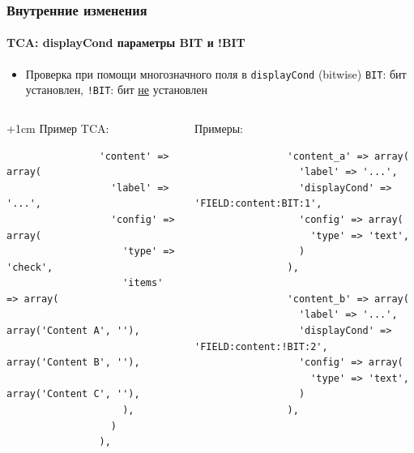 
\begin{frame}[fragile]
	\frametitle{Внутренние изменения}
	\framesubtitle{TCA: displayCond параметры BIT и !BIT}

	\lstset{
		basicstyle=\tiny\ttfamily
	}

	\begin{itemize}
		\item Проверка при помощи многозначного поля в \texttt{displayCond} (bitwise)\newline
			\texttt{BIT}: бит установлен, \texttt{!BIT}: бит \underline{не} установлен
	\end{itemize}

	\begin{columns}[T]

		\begin{column}{.5\textwidth}

			\advance\leftskip+1cm
			Пример TCA:

			\lstset{xleftmargin=1cm}

			\begin{lstlisting}
				'content' => array(
				  'label' => '...',
				  'config' => array(
				    'type' => 'check',
				    'items' => array(
				      array('Content A', ''),
				      array('Content B', ''),
				      array('Content C', ''),
				    ),
				  )
				),
			\end{lstlisting}

		\end{column}
		\begin{column}{.5\textwidth}

			Примеры:

			\begin{lstlisting}
				'content_a' => array(
				  'label' => '...',
				  'displayCond' => 'FIELD:content:BIT:1',
				  'config' => array(
				    'type' => 'text',
				  )
				),

				'content_b' => array(
				  'label' => '...',
				  'displayCond' => 'FIELD:content:!BIT:2',
				  'config' => array(
				    'type' => 'text',
				  )
				),
			\end{lstlisting}
		\end{column}

	\end{columns}

\end{frame}

